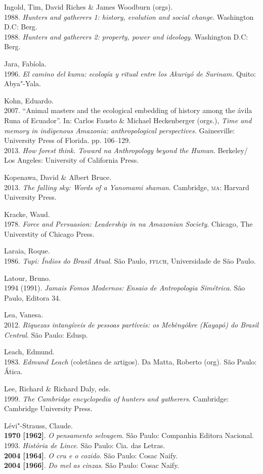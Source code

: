 \begin{bibliohedra}
Ingold, Tim, David Riches \& James Woodburn (orgs).\\
1988. \emph{Hunters and gatherers 1: history, evolution and
social change}. Washington D.C: Berg.\\
1988. \emph{Hunters and gatherers 2: property, power and
ideology}. Washington D.C: Berg.

Jara, Fabíola.\\
1996. \emph{El camino del kumu: ecología y ritual entre los
Akuriyó de Surinam.} Quito: Abya"-Yala.

Kohn, Eduardo.\\
2007. ``Animal masters and the ecological embedding of history
among the ávila Runa of Ecuador''. In: Carlos Fausto \& Michael
Heckenberger (orgs.), \emph{Time and memory in indigenous Amazonia:
anthropological perspectives.} Gainesville: University Press of Florida.
pp. 106--129.\\
2013. \emph{How forest think. Toward na Anthropology beyond the
Human}. Berkeley/ Los Angeles: University of California Press.

Kopenawa, David \& Albert Bruce.\\
2013. \emph{The falling sky: Words of a Yanomami shaman}.
Cambridge, \textsc{ma}: Harvard University Press.

Kracke, Waud.\\
1978. \emph{Force and Persuasion: Leadership in na Amazonian
Society}. Chicago, The Universtity of Chicago Press.

Laraia, Roque.\\
1986. \emph{Tupi: Índios do Brasil Atual}. São Paulo, \textsc{fflch},
Universidade de São Paulo.

Latour, Bruno.\\
1994 (1991). \emph{Jamais Fomos Modernos: Ensaio de
Antropologia Simétrica.} São Paulo, Editora 34.

Lea, Vanesa.\\
2012. \emph{Riquezas intangíveis de pessoas partíveis: os
Mebêngôkre (Kayapó) do Brasil Central}. São Paulo: Edusp.

Leach, Edmund.\\
1983. \emph{Edmund Leach} (coletânea de artigos). Da Matta,
Roberto (org). São Paulo: Ática.

Lee, Richard \& Richard Daly, eds.\\
1999. \emph{The Cambridge encyclopedia of hunters and
gatherers}. Cambridge: Cambridge University Press.

Lévi"-Strauss, Claude.\\
\textbf{1970 {[}1962{]}}. \emph{O pensamento selvagem}. São Paulo:
Companhia Editora Nacional.\\
1993. \emph{História de Lince}. São Paulo: Cia. das Letras.\\
\textbf{2004 {[}1964{]}}. \emph{O cru e o cozido}. São Paulo: Cosac
Naify.\\
\textbf{2004 {[}1966{]}}. \emph{Do mel as cinzas}. São Paulo: Cosac
Naify.


\end{bibliohedra}
